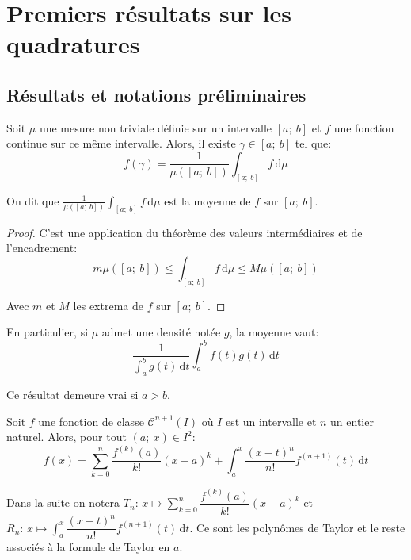 \section{Premiers résultats sur les quadratures}

\subsection{Résultats et notations préliminaires}

\begin{prop}
Soit $\mu$ une mesure non triviale définie sur un intervalle $[a;~b]$ et $f$ une fonction continue sur ce même intervalle. Alors, il existe $\gamma \in [a;~b]$ tel que:
\[
f(\gamma) = \frac{1}{\mu \left ( [a;~b]\right )} \displaystyle{\int_{[a;~b]}} f \, \mathrm d \mu 
\]


On dit que $\frac{1}{\mu \left ( [a;~b]\right )} \displaystyle{\int_{[a;~b]}} f \, \mathrm d \mu$ est la moyenne de $f$ sur $[a;~b]$.
\end{prop}

\begin{proof}
C'est une application du théorème des valeurs intermédiaires et de l'encadrement:
\[
m \mu \left ( [a;~b]\right ) \leq \displaystyle{\int_{[a;~b]}} f \, \mathrm d \mu \leq M \mu \left ( [a;~b]\right )
\]

Avec $m$ et $M$ les extrema de $f$ sur $[a;~b]$.
\end{proof}


\begin{listremarques}
\item
En particulier, si $\mu$ admet une densité notée $g$, la moyenne vaut:
\[
\frac{1}{\int_a^b g(t) \, \mathrm d t} \displaystyle{\int_a^b} f(t) g(t) \, \mathrm d t
\]
\item
Ce résultat demeure vrai si $a>b$.
\end{listremarques}


\begin{prop}
Soit $f$ une fonction de classe $\mathcal{C}^{n+1}(I)$ où $I$ est un intervalle et $n$ un entier naturel. Alors, pour tout $(a;~x) \in I^2$:
\[
f(x) = \displaystyle{\sum_{k=0}^n} \dfrac{f^{(k)}(a)}{k!} (x-a)^k + \displaystyle{\int_a^x} \dfrac{(x-t)^n}{n!} f^{(n+1)}(t) \, \mathrm d t
\]

Dans la suite on notera $T_n: \, x \mapsto \displaystyle{\sum_{k=0}^n} \dfrac{f^{(k)}(a)}{k!} (x-a)^k$ et $R_n: \, x \mapsto \displaystyle{\int_a^x} \dfrac{(x-t)^n}{n!} f^{(n+1)}(t) \, \mathrm d t$. Ce sont les polynômes de Taylor et le reste associés à la formule de Taylor en $a$.
\end{prop}

